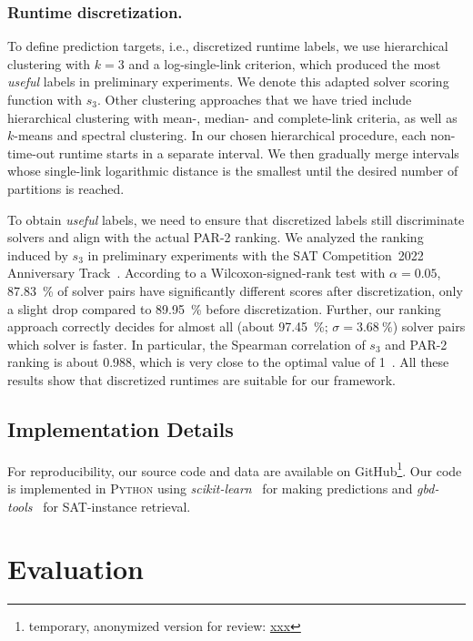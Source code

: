 \documentclass[runningheads]{llncs}
\begin{document}
\subsubsection{Runtime discretization.}

To define prediction targets, i.e., discretized runtime labels, we use hierarchical clustering with $k = 3$ and a log-single-link criterion, which produced the most \emph{useful} labels in preliminary experiments.
We denote this adapted solver scoring function with $s_3$.
Other clustering approaches that we have tried include hierarchical clustering with mean-, median- and complete-link criteria, as well as $k$-means and spectral clustering.
In our chosen hierarchical procedure, each non-time-out runtime starts in a separate interval.
We then gradually merge intervals whose single-link logarithmic distance is the smallest until the desired number of partitions is reached.

To obtain \emph{useful} labels, we need to ensure that discretized labels still discriminate solvers and align with the actual PAR-2 ranking.
We analyzed the ranking induced by $s_3$ in preliminary experiments with the SAT Competition~2022 Anniversary Track~\cite{sat2022}.
According to a Wilcoxon-signed-rank test with $\alpha = 0.05$, \SI{87.83}{\%} of solver pairs have significantly different scores after discretization, only a slight drop compared to \SI{89.95}{\%} before discretization.
Further, our ranking approach correctly decides for almost all (about \SI{97.45}{\%}; $\sigma = \SI{3.68}{\%}$) solver pairs which solver is faster.
In particular, the Spearman correlation of $s_3$ and PAR-2 ranking is about \SI{0.988}{}, which is very close to the optimal value of 1~\cite{de2016comparing}.
All these results show that discretized runtimes are suitable for our framework.

\subsection{Implementation Details}

For reproducibility, our source code and data are available on GitHub\footnote{temporary, anonymized version for review: \url{xxx}}.
Our code is implemented in \textsc{Python} using \emph{scikit-learn}~\cite{scikit-learn} for making predictions and \emph{gbd-tools}~\cite{IserS18} for SAT-instance retrieval.


\section{Evaluation}
\label{sec:eval}
\end{document}
